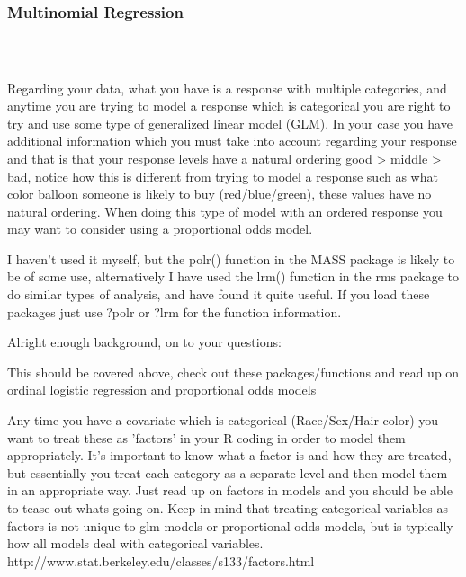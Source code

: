 \documentclass[00-GLMregslides.tex]{subfiles}
\begin{document}
	\newpage
	\Large
	
\begin{frame}[fragile]
\frametitle{Multinomial Regression}

\begin{verbatim}



\end{verbatim}	
\end{frame}
\begin{frame}
Regarding your data, what you have is a response with multiple categories, and anytime you are trying to model a response which is categorical you are right to try and use some type of generalized linear model (GLM). In your case you have additional information which you must take into account regarding your response and that is that your response levels have a natural ordering good > middle > bad, notice how this is different from trying to model a response such as what color balloon someone is likely to buy (red/blue/green), these values have no natural ordering. When doing this type of model with an ordered response you may want to consider using a proportional odds model.

\end{frame}
\begin{frame}
I haven't used it myself, but the polr() function in the MASS package is likely to be of some use, alternatively I have used the lrm() function in the rms package to do similar types of analysis, and have found it quite useful. If you load these packages just use ?polr or ?lrm for the function information.
\end{frame}
\begin{frame}
Alright enough background, on to your questions:


This should be covered above, check out these packages/functions and read up on ordinal logistic regression and proportional odds models

Any time you have a covariate which is categorical (Race/Sex/Hair color) you want to treat these as 'factors' in your R coding in order to model them appropriately. It's important to know what a factor is and how they are treated, but essentially you treat each category as a separate level and then model them in an appropriate way. Just read up on factors in models and you should be able to tease out whats going on. Keep in mind that treating categorical variables as factors is not unique to glm models or proportional odds models, but is typically how all models deal with categorical variables. http://www.stat.berkeley.edu/classes/s133/factors.html
\end{frame}
\end{document}
